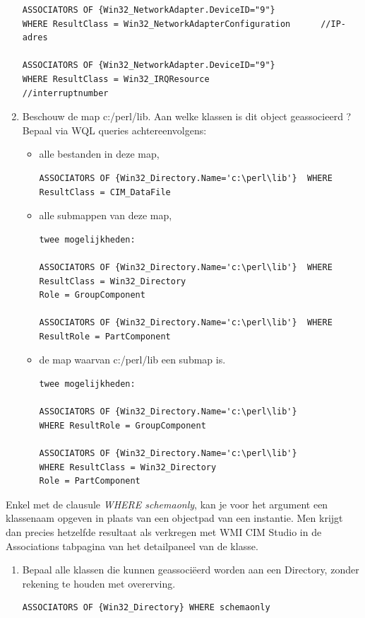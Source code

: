 \documentclass[11pt,a4paper]{report}
\begin{document}
\begin{enumerate}[resume]
\begin{lstlisting}
ASSOCIATORS OF {Win32_NetworkAdapter.DeviceID="9"}
WHERE ResultClass = Win32_NetworkAdapterConfiguration      //IP-adres

ASSOCIATORS OF {Win32_NetworkAdapter.DeviceID="9"}       
WHERE ResultClass = Win32_IRQResource                      //interruptnumber 
	\end{lstlisting}
	\item Beschouw de map c:/perl/lib. Aan welke klassen is dit object geassocieerd ? Bepaal via WQL queries achtereenvolgens:
	\begin{itemize}
		\item alle bestanden in deze map,
		\begin{lstlisting}
ASSOCIATORS OF {Win32_Directory.Name='c:\perl\lib'}  WHERE ResultClass = CIM_DataFile
		\end{lstlisting}
		\item alle submappen van deze map,
		\begin{lstlisting}
twee mogelijkheden:

ASSOCIATORS OF {Win32_Directory.Name='c:\perl\lib'}  WHERE ResultClass = Win32_Directory
Role = GroupComponent

ASSOCIATORS OF {Win32_Directory.Name='c:\perl\lib'}  WHERE ResultRole = PartComponent
		\end{lstlisting}
		\newpage
		\item de map waarvan c:/perl/lib een submap is.
		\begin{lstlisting}
twee mogelijkheden:

ASSOCIATORS OF {Win32_Directory.Name='c:\perl\lib'}
WHERE ResultRole = GroupComponent

ASSOCIATORS OF {Win32_Directory.Name='c:\perl\lib'}
WHERE ResultClass = Win32_Directory
Role = PartComponent
		\end{lstlisting}
	\end{itemize}	
\end{enumerate}
Enkel met de clausule \textit{WHERE schemaonly}, kan je voor het argument een klassenaam opgeven in plaats van een objectpad van een instantie. Men krijgt dan precies hetzelfde resultaat als verkregen met WMI CIM Studio in de Associations tabpagina van het detailpaneel van de klasse.
\begin{enumerate}[resume]
	\item Bepaal alle klassen die kunnen geassociëerd worden aan een Directory, zonder rekening te houden met overerving.
	\begin{lstlisting}
ASSOCIATORS OF {Win32_Directory} WHERE schemaonly 
	\end{lstlisting}
\end{enumerate}
\end{document}
